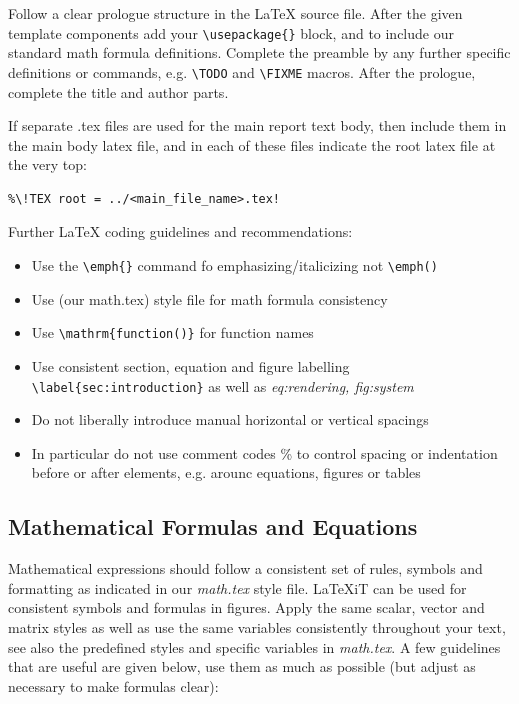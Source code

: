 \documentclass[11pt, a4paper,oneside,chapterprefix=false]{scrbook}
\newcommand{\FIXME}[1]{{\color{RED}{\textbf{FIX}: #1}}}
\begin{document}
Follow a clear prologue structure in the LaTeX source file. After the given template components add your \verb!\usepackage{}! block, and \verb!! to include our standard math formula definitions. Complete the preamble by any further specific definitions or commands, e.g. \verb!\TODO! and \verb!\FIXME! macros. After the prologue, complete the title and author parts.

If separate .tex files are used for the main report text body, then include them in the main body latex file, and in each of these files indicate the root latex file at the very top:
\begin{verbatim}
%\!TEX root = ../<main_file_name>.tex!
\end{verbatim}

\noindent
Further LaTeX coding guidelines and recommendations:

\begin{itemize}
\item Use the \verb!\emph{}! command fo emphasizing/italicizing not \verb!\emph()!
\item Use (our math.tex) style file for math formula consistency
\item Use \verb!\mathrm{function()}!  for function names
\item Use consistent section, equation and figure labelling
\verb!\label{sec:introduction}! as well as \emph{eq:rendering, fig:system}
\item Do not liberally introduce manual horizontal or vertical spacings
\item In particular do not use comment codes \% to control spacing or indentation before or after elements, e.g. arounc equations, figures or tables
\end{itemize}

\subsection*{Mathematical Formulas and Equations}

Mathematical expressions should follow a consistent set of rules, symbols and formatting as indicated in our \emph{math.tex} style file. LaTeXiT can be used for consistent symbols and formulas in figures. Apply the same scalar, vector and matrix styles as well as use the same variables consistently throughout your text, see also the predefined styles and specific variables in \emph{math.tex}. A few guidelines that are useful are given below, use them as much as possible (but adjust as necessary to make formulas clear):
\end{document}
